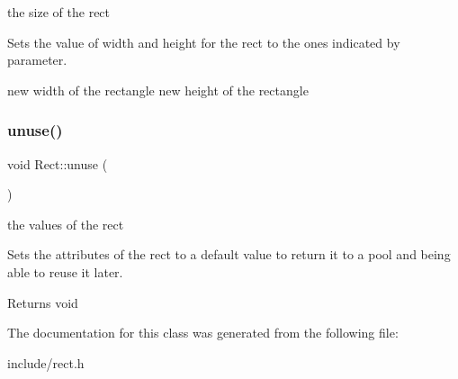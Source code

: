 the size of the rect

Sets the value of width and height for the rect to the ones indicated by parameter.

new width of the rectangle  new height of the rectangle \mbox{\label{class_rect_a31c7cbadb97080dfb559f3d04acc0bc9}} 
\subsubsection{\texorpdfstring{unuse()}{unuse()}}
{\footnotesize\ttfamily void Rect\+::unuse (\begin{DoxyParamCaption}{ }\end{DoxyParamCaption})}

the values of the rect

Sets the attributes of the rect to a default value to return it to a pool and being able to reuse it later.

\begin{DoxyReturn}{Returns}
void 
\end{DoxyReturn}


The documentation for this class was generated from the following file\+:\begin{DoxyCompactItemize}
\item 
include/rect.\+h\end{DoxyCompactItemize}
